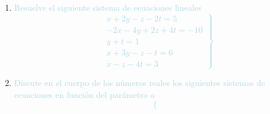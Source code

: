 \begin{enumerate}[label=\color{red}\textbf{\arabic*)},leftmargin=*]
	$\begin{aligned}
		\left[\begin{array}{cccc:cccc}
		1 & 0 & 0 & 0 & 1 & 0 & 0 & 0 \\
		a & 1 & 0 & 0 & 0 & 1 & 0 & 0 \\
		a^2 & a & 1 & 0 & 0 & 0 & 1 & 0 \\
		a^3 & a^2 & a & 1 & 0 & 0 & 0 & 1
	\end{array}\right]&\xrightarrow[\begin{subarray}{l}
	F_4\to F_4-a^3F_1\\
	F_3\to F_3-a^2F_1
	\end{subarray}]{F_2\to F_2-aF_1}\left[\begin{array}{cccc:cccc}
	1 & 0 & 0 & 0 & 1 & 0 & 0 & 0 \\
	0 & 1 & 0 & 0 & -a & 1 & 0 & 0 \\
	0 & a & 1 & 0 & -a^2 & 0 & 1 & 0 \\
	0 & a^2 & a & 1 & -a^3 & 0 & 0 & 1
	\end{array}\right]\\
	&\xrightarrow[F_4\to F_4-a^2F_2]{F_3\to F_3-aF_2}\left[\begin{array}{cccc:cccc}
	1 & 0 & 0 & 0 & 1 & 0 & 0 & 0 \\
	0 & 1 & 0 & 0 & -a & 1 & 0 & 0 \\
	0 & 0 & 1 & 0 & a^2 & 1 & 0 & 0 \\
	0 & 0 & a & 1 & a^4-a^3 & 0 & -a^2 & 1
	\end{array}\right]\\
	&\xrightarrow{F_4\to F_4-aF_3}\left[\begin{array}{cccc:cccc}
		1 & 0 & 0 & 0 & 1 & 0 & 0 & 0 \\
		0 & 1 & 0 & 0 & -a & 1 & 0 & 0 \\
		0 & 0 & 1 & 0 & a^2 & -a & 1 & 0 \\
		0 & 0 & 0 & 1 & a^4-2a^3 & a^2 & -a^2+a & 1
	\end{array}\right]
	\end{aligned}$
	\item \textcolor{lightblue}{Resuelve el siguiente sistema de ecuaciones lineales \[ \left.\begin{array}{r}
			x+2y-z-2t=5\\
			-2x-4y+2z+4t=-10\\
			y+t=1\\
			x+3y-z-t=6\\
			x-z-4t=3
		\end{array}\right\} \]}
	\item \textcolor{lightblue}{Discute en el cuerpo de los números reales los siguientes sistemas de ecuaciones en función del parámetro $a$ \[ \left\{\begin{array}{rcrcrcrcc}

\end{array}\]}
\end{enumerate}
